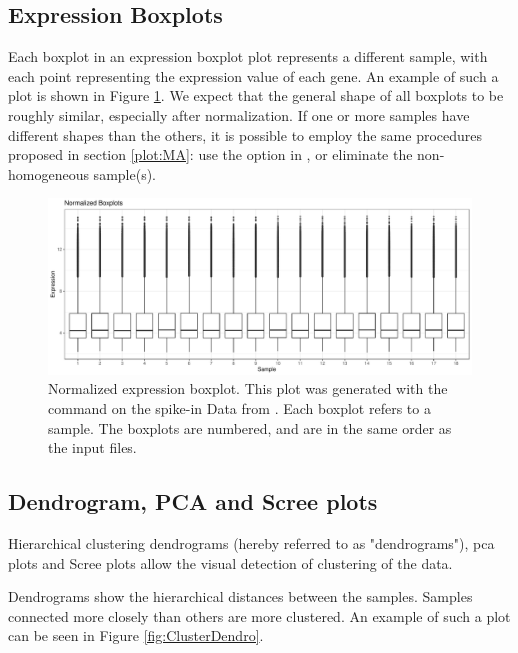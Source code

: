 \subsection{Expression Boxplots}
\label{plot:exprBox}
Each boxplot in an expression boxplot plot represents a different sample, with each point representing the expression value of each gene. An example of such a plot is shown in Figure \ref{fig:ExprBoxplot}. We expect that the general shape of all boxplots to be roughly similar, especially after normalization. If one or more samples have different shapes than the others, it is possible to employ the same procedures proposed in section \ref{plot:MA}: use the  option in , or eliminate the non-homogeneous sample(s).

\begin{figure}
    \centering
    \includegraphics{resources/images/Normalized Boxplots.pdf}
    \caption{Normalized expression boxplot. This plot was generated with the  command on the spike-in Data from \textcite{zhuPreferredAnalysisMethods2010}. Each boxplot refers to a sample. The boxplots are numbered, and are in the same order as the input files.}
    \label{fig:ExprBoxplot}
\end{figure}

\subsection{Dendrogram, PCA and Scree plots}
Hierarchical clustering dendrograms (hereby referred to as "dendrograms"), \gls{pca} plots and Scree plots allow the visual detection of clustering of the data.

Dendrograms show the hierarchical distances between the samples. Samples connected more closely than others are more clustered. An example of such a plot can be seen in Figure \ref{fig:ClusterDendro}.

